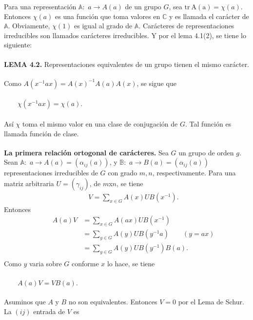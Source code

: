 \documentclass[12pt]{book}
\theoremstyle{definition}
\newcounter{in}
\begin{document}
Para una representación $\mathbb{A}:$ $a\rightarrow A\left(a\right)$ de un grupo $G$, sea $\mathrm{tr\ A(a)}=\chi(a)$. Entonces $\chi(a)$ es una función que toma valores en $\mathbb{C}$  y es llamada el carácter de $\mathbb{A}$. Obviamente, $\chi(1)$ es igual al grado de $\mathbb{A}$. Carácteres de representaciones irreducibles son llamados carácteres irreducibles. Y por el lema 4.1(2), se tiene lo siguiente:\\~\\
\textbf{LEMA 4.2. } Representaciones equivalentes de un grupo tienen el mismo carácter.\\~\\
Como $A(x^{-1}ax)=A(x)^{-1}A(a)A(x)$, se sigue que\\~\\
$\qquad \chi(x^{-1}ax)=\chi(a)$.\\~\\
Así $\chi$ toma el mismo valor en una clase de conjugación de $G$. Tal función es llamada función de clase.\\~\\
\textbf{La primera relación ortogonal de carácteres.} Sea $G$ un grupo de orden $g$. Sean $\mathbb{A}:$ $a\rightarrow A\left(a\right) = (\alpha_{ij}(a))$, y $\mathbb{B}:$ $a\rightarrow B\left(a\right) = (\alpha_{ij}(a))$ representaciones irreducibles de $G$ con grado $m,n$, respectivamente. Para una matriz arbitraria $U=(\gamma_{ij})$, de $m$x$n$, se tiene\\
\begin{equation*}
\begin{aligned}
\qquad V=\sum_{x \in G} A(x)UB(x^{-1}).
\end{aligned}
\end{equation*}
Entonces
\begin{equation*}
\begin{aligned}
\qquad A(a)V &=\sum_{x \in G} A(ax)UB(x^{-1})\\
&=\sum_{y \in G} A(y)UB(y^{-1}a) \qquad (y=ax)\\
&=\sum_{y \in G} A(y)UB(y^{-1})B(a).\\
\end{aligned}
\end{equation*}
Como $y$ varia sobre $G$ conforme $x$ lo hace, 	se tiene\\~\\
$\qquad A(a)V=VB(a).$\\~\\
Asuminos que $A$ y $B$ no son equivalentes. Entonces $V=0$ por el Lema de Schur. La $(ij)$ entrada de $V$ es
\end{document}

